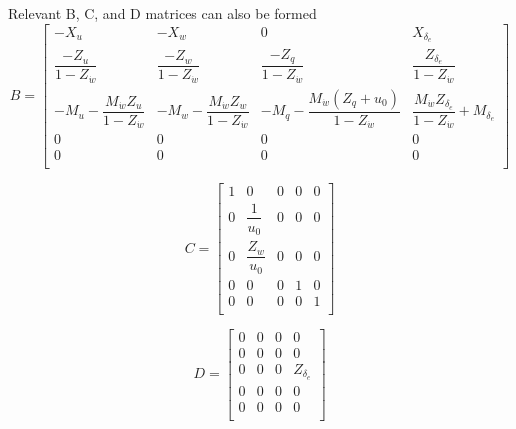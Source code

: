 \documentclass[12pt]{article}
\begin{document}
\noindent Relevant B, C, and D matrices can also be formed
\begin{equation*}
B =
\begin{bmatrix}
-X_u                                          & -X_w                                          & 0                                               & X_{\delta_e} \\
\dfrac{-Z_u}{1-Z_{\dot{w}}}                   & \dfrac{-Z_w}{1-Z_{\dot{w}}}                   & \dfrac{-Z_q}{1-Z_{\dot{w}}}                     & \dfrac{Z_{\delta_e}}{1-Z_{\dot{w}}} \\
-M_u - \dfrac{M_{\dot{w}} Z_u}{1-Z_{\dot{w}}} & -M_w - \dfrac{M_{\dot{w}} Z_w}{1-Z_{\dot{w}}} & -M_q -\dfrac{M_{\dot{w}} (Z_q + u_0)}{1-Z_{\dot{w}}} & \dfrac{M_{\dot{w}} Z_{\delta_e}}{1-Z_{\dot{w}}} + M_{\delta_e} \\


    0   &  0   &  0   & 0 \\
    0   &  0   &  0   & 0 \\
\end{bmatrix}
\end{equation*}

\begin{equation*}
C =
\begin{bmatrix}
    1 & 0     & 0 & 0 & 0\\
    0 & \dfrac{1}{u_0} & 0 & 0 & 0\\
    0 & \dfrac{Z_w}{u_0} & 0 & 0 & 0\\
    0 & 0     & 0 & 1 & 0\\
    0 & 0     & 0 & 0 & 1\\
\end{bmatrix}
\end{equation*}

\begin{equation*}
D =
\begin{bmatrix}
    0 & 0 & 0 & 0    \\
    0 & 0 & 0 & 0    \\
    0 & 0 & 0 & Z_{\delta_e} \\
    0 & 0 & 0 & 0     \\
    0 & 0 & 0 & 0     \\
\end{bmatrix}
\end{equation*}
\end{document}
